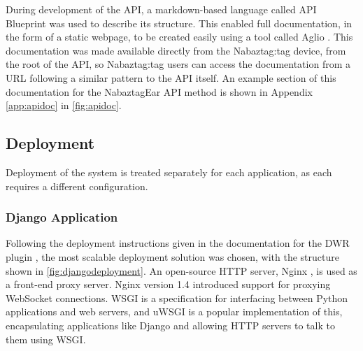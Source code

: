 \documentclass[12pt, a4paper]{article}
\begin{document}
During development of the \ac{API}, a markdown-based language called \ac{API} Blueprint \parencite{apiblueprint} was used to describe its structure. This enabled full documentation, in the form of a static webpage, to be created easily using a tool called Aglio \parencite{aglio}. This documentation was made available directly from the Nabaztag:tag device, from the root of the \ac{API}, so Nabaztag:tag users can access the documentation from a \ac{URL} following a similar pattern to the \ac{API} itself. An example section of this documentation for the NabaztagEar \ac{API} method is shown in Appendix \ref{app:apidoc} in \autoref{fig:apidoc}.
	
	\subsection{Deployment}
	
	Deployment of the system is treated separately for each application, as each requires a different configuration.
	
	\subsubsection{Django Application}
	
	Following the deployment instructions given in the documentation for the \ac{DWR} plugin \parencite{djangowsredis}, the most scalable deployment solution was chosen, with the structure shown in \autoref{fig:djangodeployment}. An open-source \ac{HTTP} server, Nginx \parencite{nginx}, is used as a front-end proxy server. Nginx version 1.4 introduced support for proxying WebSocket connections. \ac{WSGI} is a specification for interfacing between Python applications and web servers, and uWSGI \parencite{uwsgi} is a popular implementation of this, encapsulating applications like Django and allowing \ac{HTTP} servers to talk to them using \ac{WSGI}.
	
\end{document}
